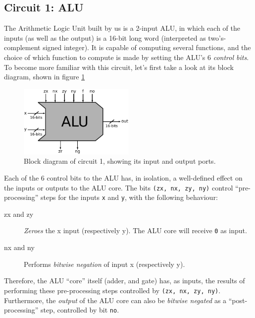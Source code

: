     \subsection{Circuit 1: ALU}
    \label{subsec:circuit-alu}

        The Arithmetic Logic Unit built by us is a 2-input ALU, in which each of the inputs (as well
        as the output) is a 16-bit long word (interpreted as two's-complement signed integer). It is
        capable of computing several functions, and the choice of which function to compute is made
        by setting the ALU's 6 \emph{control bits}. To become more familiar with this circuit, let's
        first take a look at its block diagram, shown in figure \ref{fig:alu-block}

        \begin{figure}[h!]
            \centerline{\includegraphics[width=0.5\textwidth]{imgs/alu-block.pdf}}
            \caption{Block diagram of circuit 1, showing its input and output ports.
                \label{fig:alu-block}}
        \end{figure}

        Each of the 6 control bits to the ALU has, in isolation, a well-defined effect on the inputs
        or outputs to the ALU core. The bits \texttt{(zx, nx, zy, ny)} control ``pre-processing''
        steps for the inputs \texttt{x} and \texttt{y}, with the following behaviour:

        \begin{description}
            \item[zx and zy] \emph{Zeroes} the x input (respectively y). The ALU core will receive
                \texttt{0} as input.

            \item[nx and ny] Performs \emph{bitwise negation} of input x (respectively y).
        \end{description}

        Therefore, the ALU ``core'' itself (adder, and gate) has, as inputs, the results of
        performing these pre-processing steps controlled by \texttt{(zx, nx, zy, ny)}.  Furthermore,
        the \emph{output} of the ALU core can also be \emph{bitwise negated} as a
        ``post-processing'' step, controlled by bit \texttt{no}.


